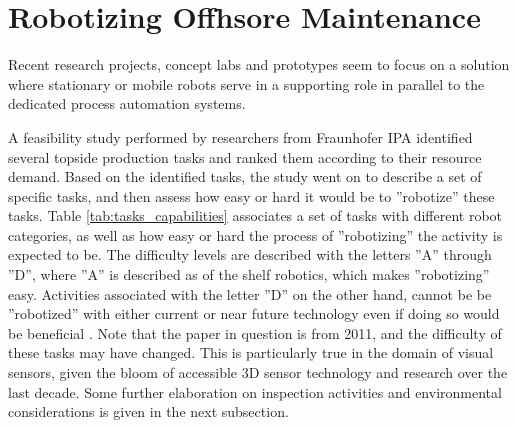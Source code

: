 

\section{Robotizing Offhsore Maintenance}
\label{sec:robotizing_offhsore_maintenance}

Recent research projects, concept labs and prototypes seem to focus on a solution where stationary or mobile robots serve in a supporting role in parallel to the dedicated process automation systems\cite{StepwiseApproachToRobotics}\cite{sintef_robot_consept}\cite{graf2008mobile}\cite{6094661}. 

A feasibility study performed by researchers from \ac{Fraunhofer IPA}\cite{6094661} identified several topside production tasks and ranked them according to their resource demand. 
Based on the identified tasks, the study went on to describe a set of specific tasks, and then assess how easy or hard it would be to ''robotize'' these tasks. Table \ref{tab:tasks_capabilities} associates a set of tasks with different robot categories, as well as how easy or hard the process of ''robotizing'' the activity is expected to be. The difficulty levels are described with the letters ''A'' through ''D'', where  ''A'' is described as of the shelf robotics, which makes ''robotizing'' easy. Activities associated with the letter ''D'' on the other hand, cannot be be ''robotized'' with either current or near future technology even if doing so would be beneficial \cite{6094661}. Note that the paper in question is from 2011, and the difficulty of these tasks may have changed. This is particularly true in the domain of visual sensors, given the bloom of accessible 3D sensor technology and research over the last decade. Some further elaboration on inspection activities and environmental considerations is given in the next subsection. 

